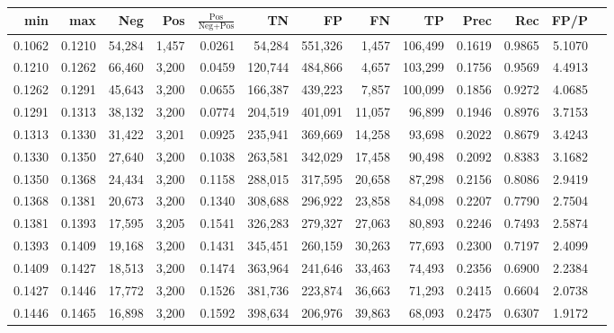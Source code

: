 \begin{tabular}{rrrrrrrrrrrrr}
\toprule
   min &    max &    Neg &   Pos & $\frac{\text{Pos}}{\text{Neg}+\text{Pos}}$ &      TN &      FP &      FN &      TP &   Prec &    Rec &   FP/P \\
\midrule
0.1062 & 0.1210 & 54,284 & 1,457 &                                     0.0261 &  54,284 & 551,326 &   1,457 & 106,499 & 0.1619 & 0.9865 & 5.1070 \\
0.1210 & 0.1262 & 66,460 & 3,200 &                                     0.0459 & 120,744 & 484,866 &   4,657 & 103,299 & 0.1756 & 0.9569 & 4.4913 \\
0.1262 & 0.1291 & 45,643 & 3,200 &                                     0.0655 & 166,387 & 439,223 &   7,857 & 100,099 & 0.1856 & 0.9272 & 4.0685 \\
0.1291 & 0.1313 & 38,132 & 3,200 &                                     0.0774 & 204,519 & 401,091 &  11,057 &  96,899 & 0.1946 & 0.8976 & 3.7153 \\
0.1313 & 0.1330 & 31,422 & 3,201 &                                     0.0925 & 235,941 & 369,669 &  14,258 &  93,698 & 0.2022 & 0.8679 & 3.4243 \\
0.1330 & 0.1350 & 27,640 & 3,200 &                                     0.1038 & 263,581 & 342,029 &  17,458 &  90,498 & 0.2092 & 0.8383 & 3.1682 \\
0.1350 & 0.1368 & 24,434 & 3,200 &                                     0.1158 & 288,015 & 317,595 &  20,658 &  87,298 & 0.2156 & 0.8086 & 2.9419 \\
0.1368 & 0.1381 & 20,673 & 3,200 &                                     0.1340 & 308,688 & 296,922 &  23,858 &  84,098 & 0.2207 & 0.7790 & 2.7504 \\
0.1381 & 0.1393 & 17,595 & 3,205 &                                     0.1541 & 326,283 & 279,327 &  27,063 &  80,893 & 0.2246 & 0.7493 & 2.5874 \\
0.1393 & 0.1409 & 19,168 & 3,200 &                                     0.1431 & 345,451 & 260,159 &  30,263 &  77,693 & 0.2300 & 0.7197 & 2.4099 \\
0.1409 & 0.1427 & 18,513 & 3,200 &                                     0.1474 & 363,964 & 241,646 &  33,463 &  74,493 & 0.2356 & 0.6900 & 2.2384 \\
0.1427 & 0.1446 & 17,772 & 3,200 &                                     0.1526 & 381,736 & 223,874 &  36,663 &  71,293 & 0.2415 & 0.6604 & 2.0738 \\
0.1446 & 0.1465 & 16,898 & 3,200 &                                     0.1592 & 398,634 & 206,976 &  39,863 &  68,093 & 0.2475 & 0.6307 & 1.9172 \\

\end{tabular}
